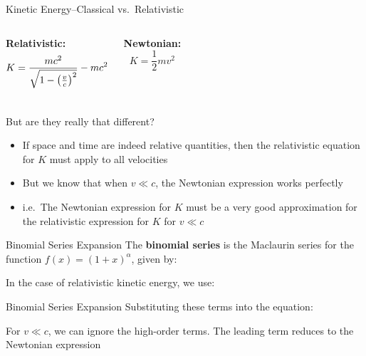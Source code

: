 \documentclass[12pt,compress,aspectratio=169]{beamer}
\newcommand{\bigsqrt}{\ensuremath\sqrt{1-\left(\frac{v}{c}\right)^2}}
\begin{document}
\begin{frame}{Kinetic Energy--Classical vs.\ Relativistic}
  \begin{columns}
    \textbf{Relativistic:}
    {\Large
      \begin{displaymath}
        K=\frac{mc^2}{\bigsqrt}-mc^2
      \end{displaymath}
    }
    
    \textbf{Newtonian:}
    {\Large
      \begin{displaymath}
        K=\frac12mv^2
      \end{displaymath}
    }
  \end{columns}
  But are they really that different?
  \begin{itemize}
  \item If space and time are indeed relative quantities, then the relativistic
    equation for $K$ must apply to all velocities
  \item But we know that when $v\ll c$, the Newtonian expression works perfectly
  \item i.e.\ The Newtonian expression for $K$ must be a very good approximation
    for the relativistic expression for $K$ for $v\ll c$
  \end{itemize}
\end{frame}




\begin{frame}{Binomial Series Expansion}
  The \textbf{binomial series} is the Maclaurin series for the function
  $f(x)=(1+x)^\alpha$, given by:
  

  In the case of relativistic kinetic energy, we use:

\end{frame}



\begin{frame}{Binomial Series Expansion}
  Substituting these terms into the equation:
  
  
  For $v\ll c$, we can ignore the high-order terms. The leading term reduces to
  the Newtonian expression
\end{frame}
\end{document}
